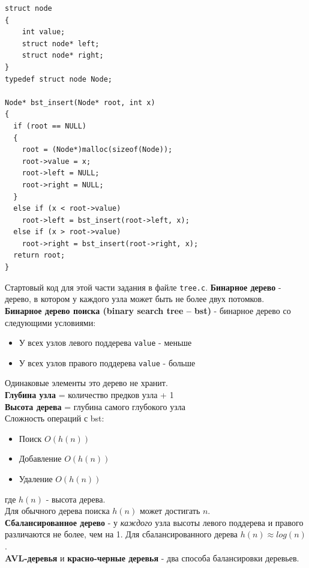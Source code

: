\documentclass{article}
\begin{document}
\begin{multicols}{2}
\begin{lstlisting}
struct node
{
    int value;
    struct node* left;
    struct node* right;
}
typedef struct node Node;

Node* bst_insert(Node* root, int x)
{
  if (root == NULL)
  {
    root = (Node*)malloc(sizeof(Node));
    root->value = x;
    root->left = NULL;
    root->right = NULL;
  }
  else if (x < root->value)
    root->left = bst_insert(root->left, x);
  else if (x > root->value)
    root->right = bst_insert(root->right, x);
  return root;
}
\end{lstlisting}
\vfill\null
\columnbreak
Стартовый код для этой части задания в файле \texttt{tree.c}.
\textbf{Бинарное дерево} - дерево, в котором у каждого узла может быть не более двух потомков.\\
\textbf{Бинарное дерево поиска (binary search tree -- bst)} - бинарное дерево со следующими условиями:
\begin{itemize}
\item У всех узлов левого поддерева \texttt{value} - меньше
\item У всех узлов правого поддерева \texttt{value} - больше
\end{itemize}
Одинаковые элементы это дерево не хранит.\\
\textbf{Глубина узла} = количество предков узла + 1\\
\textbf{Высота дерева} = глубина самого глубокого узла\\
Сложность операций с bst:
\begin{itemize}
\item Поиск $O(h(n))$
\item Добавление $O(h(n))$
\item Удаление $O(h(n))$
\end{itemize}
где $h(n)$ - высота дерева.\\
Для обычного дерева поиска $h(n)$ может достигать $n$.\\
\textbf{Сбалансированное дерево} - у \textit{каждого} узла высоты левого поддерева и правого различаются не более, чем на 1.
Для сбалансированного дерева $h(n) \approx log(n)$.\\
\textbf{AVL-деревья} и \textbf{красно-черные деревья} - два способа балансировки деревьев.
\vfill\null
\end{multicols}
\newpage
\end{document}
